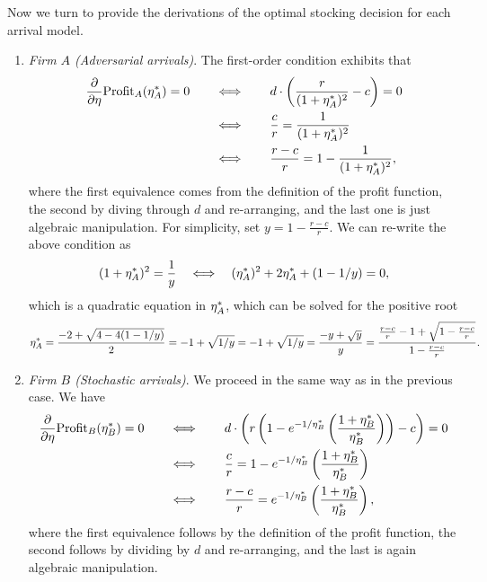 Now we turn to provide the derivations of the optimal stocking decision for each arrival model.
 \begin{enumerate}
    \item \textit{Firm $A$ (Adversarial arrivals)}. The first-order condition exhibits that
    \begin{align*}
        \frac{\partial}{\partial \eta} \text{Profit}_{A}(\eta^*_A) = 0 \qquad &\Longleftrightarrow \qquad d \cdot \left( \frac{r}{(1+\eta^*_A)^2} - c \right) = 0\\
        &\Longleftrightarrow \qquad \frac{c}{r} = \frac{1}{(1+\eta^*_A)^2}\\
        &\Longleftrightarrow \qquad \frac{r-c}{r} = 1-\frac{1}{(1+\eta^*_A)^2},
    \end{align*}
    where the first equivalence comes from the definition of the profit function, the second by diving through $d$ and re-arranging, and the last one is just algebraic manipulation. For simplicity, set $y = 1 - \frac{r-c}{r}$. We can re-write the above condition as
    \begin{equation*}
        (1+\eta_A^*)^2 = \frac{1}{y} \quad \Longleftrightarrow \quad (\eta_A^*)^2 + 2 \eta_A^* + (1 - 1/y) = 0,
    \end{equation*}
    which is a quadratic equation in $\eta_A^*$, which can be solved for the positive root
    \begin{equation*}
        \eta_A^*=\frac{-2 + \sqrt{4-4(1-1/y)}}{2} = -1 + \sqrt{1/y} = -1 + \sqrt{1/y} = \frac{-y + \sqrt{y}}{y} = \frac{\frac{r-c}{r} - 1 + \sqrt{1 - \frac{r-c}{r}}}{1 - \frac{r-c}{r}}.
    \end{equation*}
    \item \textit{Firm $B$ (Stochastic arrivals)}. We proceed in the same way as in the previous case. We have
    \begin{align*}
        \frac{\partial}{\partial \eta} \text{Profit}_{B}(\eta^*_B) = 0 \qquad &\Longleftrightarrow \qquad d \cdot \left( r\left( 1 - e^{-1/\eta^*_B}\left(\frac{1+\eta^*_B}{\eta^*_B}\right) \right) - c \right) = 0\\
        &\Longleftrightarrow \qquad \frac{c}{r} = 1 - e^{-1/\eta^*_B}\left(\frac{1+\eta^*_B}{\eta^*_B}\right)\\
        &\Longleftrightarrow \qquad \frac{r-c}{r} = e^{-1/\eta^*_B}\left(\frac{1+\eta^*_B}{\eta^*_B}\right),
    \end{align*}
    where the first equivalence follows by the definition of the profit function, the second follows by dividing by $d$ and re-arranging, and the last is again algebraic manipulation.

\end{enumerate}
